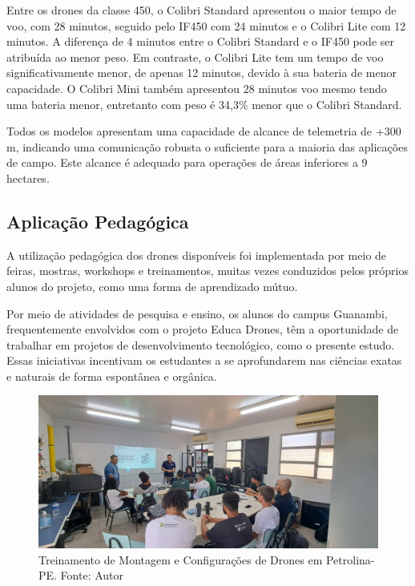 \documentclass[conference]{IEEEtran}
\begin{document}
Entre os drones da classe 450, o Colibri Standard  apresentou o maior tempo de voo, com 28 minutos, seguido pelo IF450 com 24 minutos e o Colibri Lite com 12 minutos. A diferença de 4 minutos entre o Colibri Standard e o IF450 pode ser atribuída ao menor peso. Em contraste, o Colibri Lite tem um tempo de voo significativamente menor, de apenas 12 minutos, devido à sua bateria de menor capacidade. O Colibri Mini também apresentou 28 minutos voo mesmo tendo uma bateria menor, entretanto com peso é 34,3\% menor que o Colibri Standard. 

Todos os modelos apresentam uma capacidade de alcance de telemetria de +300 m, indicando uma comunicação robusta o suficiente para a maioria das aplicações de campo. Este alcance é adequado para operações de áreas inferiores a 9 hectares.

\subsection{Aplicação Pedagógica}

A utilização pedagógica dos drones disponíveis foi implementada por meio de feiras, mostras, workshops e treinamentos, muitas vezes conduzidos pelos próprios alunos do projeto, como uma forma de aprendizado mútuo.

Por meio de atividades de pesquisa e ensino, os alunos do campus Guanambi, frequentemente envolvidos com o projeto Educa Drones, têm a oportunidade de trabalhar em projetos de desenvolvimento tecnológico, como o presente estudo. Essas iniciativas incentivam os estudantes a se aprofundarem nas ciências exatas e naturais de forma espontânea e orgânica.

\begin{figure}[!htb]
    \centering
    \includegraphics[scale=0.12]{img/petrolina.jpg} 
    \caption{Treinamento de Montagem e Configurações de Drones em Petrolina-PE. Fonte: Autor}
    \label{fig:petrolina}
\end{figure}
\end{document}
